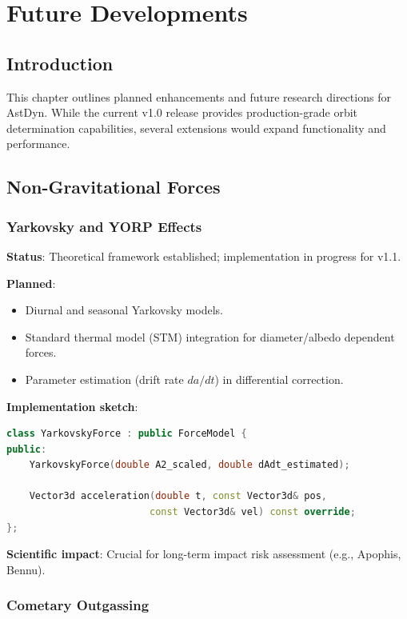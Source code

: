 \chapter{Future Developments}
\label{ch:future}

\section{Introduction}

This chapter outlines planned enhancements and future research directions for AstDyn. While the current v1.0 release provides production-grade orbit determination capabilities, several extensions would expand functionality and performance.

\section{Non-Gravitational Forces}

\subsection{Yarkovsky and YORP Effects}

\textbf{Status}: Theoretical framework established; implementation in progress for v1.1.

\textbf{Planned}:
\begin{itemize}
    \item Diurnal and seasonal Yarkovsky models.
    \item Standard thermal model (STM) integration for diameter/albedo dependent forces.
    \item Parameter estimation (drift rate $da/dt$) in differential correction.
\end{itemize}

\textbf{Implementation sketch}:
\begin{lstlisting}[language=C++]
class YarkovskyForce : public ForceModel {
public:
    YarkovskyForce(double A2_scaled, double dAdt_estimated);
    
    Vector3d acceleration(double t, const Vector3d& pos, 
                         const Vector3d& vel) const override;
};
\end{lstlisting}

\textbf{Scientific impact}: Crucial for long-term impact risk assessment (e.g., Apophis, Bennu).

\subsection{Cometary Outgassing}

